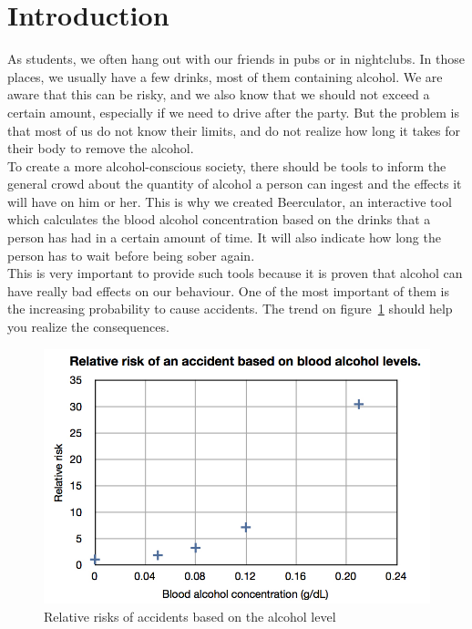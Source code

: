 \section{Introduction}
\label{sec:intro}

As students, we often hang out with our friends in pubs or in nightclubs. In those places, we usually have a few drinks, most of them containing alcohol. We are aware that this can be risky, and we also know that we should not exceed a certain amount, especially if we need to drive after the party. But the problem is that most of us do not know their limits, and do not realize how long it takes for their body to remove the alcohol. \\

To create a more alcohol-conscious society, there should be tools to inform the general crowd about the quantity of alcohol a person can ingest and the effects it will have on him or her. This is why we created Beerculator, an interactive tool which calculates the blood alcohol concentration based on the drinks that a person has had in a certain amount of time. It will also indicate how long the person has to wait before being sober again.\\

This is very important to provide such tools because it is proven that alcohol can have really bad effects on our behaviour. One of the most important of them is the increasing probability to cause accidents. The trend on {\sc figure}~\ref{fig:risks} should help you realize the consequences.

\vspace{2cm}

\begin{figure}[H]
	\centering
   \includegraphics[scale=0.5]{./figures/risks.jpg}
   \caption{Relative risks of accidents based on the alcohol level}
   \label{fig:risks}
\end{figure}
